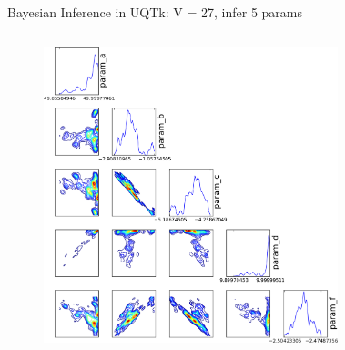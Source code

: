 \documentclass[10pt]{beamer}
\begin{document}
\begin{frame}{Bayesian Inference in UQTk: V = 27, infer 5 params}
	\begin{columns}[c]
			\begin{figure}
	 	 		\includegraphics[width=\textwidth]{V27most_posteriors}
	 		\end{figure} 	
	 		\begin{figure}[ht]
	 			\newline
	 			\newline

\end{figure}
\end{columns}
\end{frame}
\end{document}
